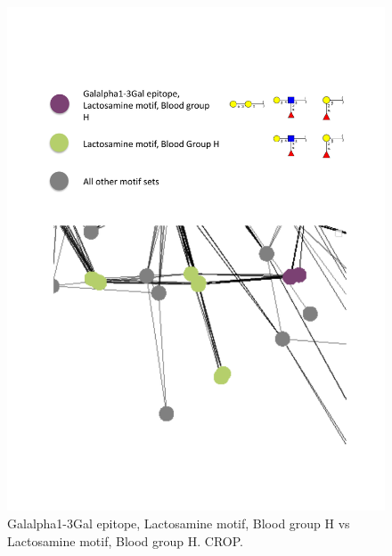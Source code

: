 \documentclass[12pt,a4paper]{article}
\begin{document}
\begin{figure}[H]
\centering 
\includegraphics[scale=0.7]{motif_similarity_exploration/Galalpha1-3Gal_epitope_Lactosamine_motif_Blood_group_H_vs_Lactosamine_motif_Blood_group_H.pdf} 
\caption{Galalpha1-3Gal epitope, Lactosamine motif, Blood group H vs Lactosamine motif, Blood group H. CROP.}
\label{fig:Galalpha1-3Gal_epitope_Lactosamine_motif_Blood_group_H_vs_Lactosamine_motif_Blood_group_H}
\end{figure}
\end{document}

